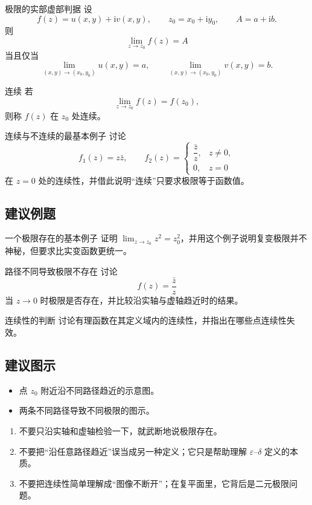 \begin{dingli}{极限的实部虚部判据}{}
设
\[
    f(z)=u(x,y)+\mathrm{i}v(x,y),\qquad z_0=x_0+\mathrm{i}y_0,\qquad A=a+\mathrm{i}b.
\]
则
\[
    \lim_{z\to z_0}f(z)=A
\]
当且仅当
\[
    \lim_{(x,y)\to(x_0,y_0)}u(x,y)=a,\qquad
    \lim_{(x,y)\to(x_0,y_0)}v(x,y)=b.
\]
\end{dingli}

\begin{dingliyi}{连续}{}
若
\[
    \lim_{z\to z_0}f(z)=f(z_0),
\]
则称 $f(z)$ 在 $z_0$ 处连续。
\end{dingliyi}

\begin{lizi}{连续与不连续的最基本例子}{}
讨论
\[
    f_1(z)=z\bar z,\qquad
    f_2(z)=
    \begin{cases}
        \dfrac{\bar z}{z},& z\neq 0,\\
        0,& z=0
    \end{cases}
\]
在 $z=0$ 处的连续性，并借此说明``连续''只要求极限等于函数值。
\end{lizi}

\subsection*{建议例题}
\begin{lizi}{一个极限存在的基本例子}{}
证明 $\lim_{z\to z_0} z^2 = z_0^2$，并用这个例子说明复变极限并不神秘，但要求比实变函数更统一。
\end{lizi}

\begin{lizi}{路径不同导致极限不存在}{}
讨论
\[
    f(z)=\frac{\bar z}{z}
\]
当 $z\to 0$ 时极限是否存在，并比较沿实轴与虚轴趋近时的结果。
\end{lizi}

\begin{lizi}{连续性的判断}{}
讨论有理函数在其定义域内的连续性，并指出在哪些点连续性失效。
\end{lizi}

\subsection*{建议图示}
\begin{itemize}
    \item 点 $z_0$ 附近沿不同路径趋近的示意图。
    \item 两条不同路径导致不同极限的图示。
\end{itemize}

\begin{jinshi}[本节易错点]
\begin{enumerate}
    \item 不要只沿实轴和虚轴检验一下，就武断地说极限存在。
    \item 不要把``沿任意路径趋近''误当成另一种定义；它只是帮助理解 $\varepsilon$--$\delta$ 定义的本质。
    \item 不要把连续性简单理解成``图像不断开''；在复平面里，它背后是二元极限问题。
\end{enumerate}
\end{jinshi}

